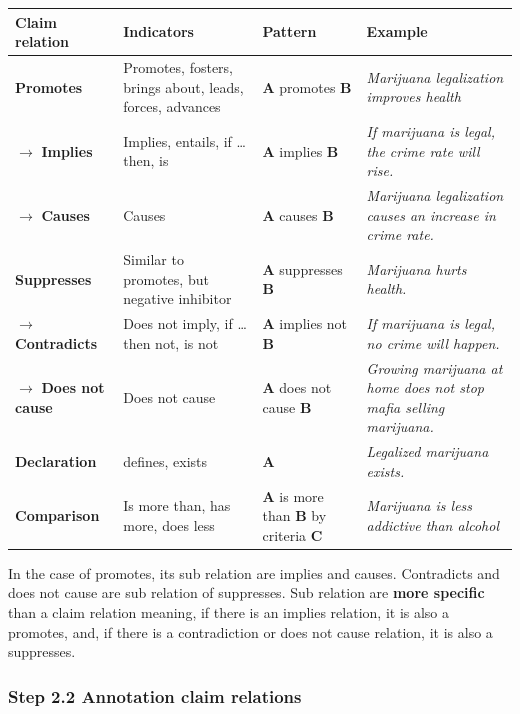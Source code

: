 \begin{table}[h!]
\begin{tabular}{| l | p{3.5cm} | p{3cm} | p{5cm}| }
\hline
\cellcolor{gray!25} Claim relation & \cellcolor{gray!25}Indicators &
\cellcolor{gray!25}Pattern & \cellcolor{gray!25}Example \\
\hline
	\textbf{Promotes} & 
	Promotes, fosters, brings about, leads, forces, advances & 
	\textbf{A} promotes \textbf{B} &
\textit{Marijuana legalization improves health} \\
\hline
	$\rightarrow$ \textbf{Implies} & 
	Implies, entails, if \dots then, is &
	\textbf{A} implies \textbf{B} &
\textit{If marijuana is legal, the crime rate will rise. } \\
\hline
	$\rightarrow$ \textbf{Causes} &
	Causes &
	\textbf{A} causes \textbf{B} &
\textit{Marijuana legalization causes an increase in crime rate.} \\
\hline
	\textbf{Suppresses} &
	Similar to promotes, but negative inhibitor &
	\textbf{A} suppresses \textbf{B} &
	\textit{ Marijuana hurts health. } \\
	\hline
	$\rightarrow$ \textbf{Contradicts} &
	Does not imply, if \dots then not, is not &
	\textbf{A} implies not \textbf{B} &
\textit{If marijuana is legal, no crime will happen. } \\
\hline
	$\rightarrow$ \textbf{Does not cause} &
	Does not cause &
	\textbf{A} does not cause \textbf{B} &
\textit{Growing marijuana at home does not stop mafia selling marijuana. } \\
\hline
	\textbf{Declaration} &
	defines, exists &
	\textbf{A} &
\textit{Legalized marijuana exists.} \\
\hline
	\textbf{Comparison} & 
	Is more than, has more, does less &
	\textbf{A} is more than \textbf{B} by criteria \textbf{C} &
\textit{Marijuana is less addictive than alcohol} \\
\hline
\end{tabular}
\end{table}

In the case of promotes, its sub relation are implies and causes. Contradicts
and does not cause are sub relation of suppresses. Sub relation are \textbf{more specific}
than a claim relation meaning, if there is an implies relation, it is also a
promotes, and, if there is a contradiction or does not cause relation, it is
also a suppresses. 

\subsubsection*{Step 2.2 Annotation claim relations}

